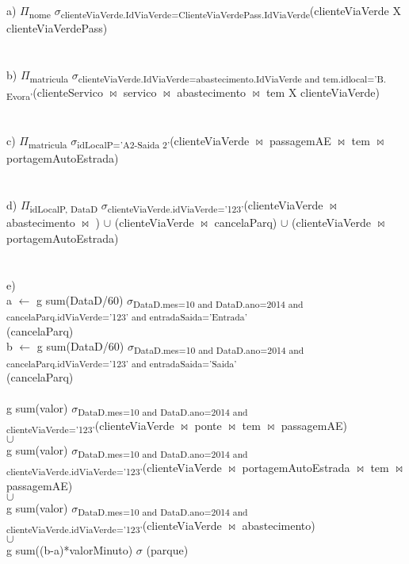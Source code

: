 \documentclass[a4paper]{article}
\begin{document}
\noindent a)
\indent $\Pi$\textsubscript{nome} $\sigma$\textsubscript{clienteViaVerde.IdViaVerde=ClienteViaVerdePass.IdViaVerde}(clienteViaVerde X clienteViaVerdePass)\\
\\
\\
\noindent b)
\indent $\Pi$\textsubscript{matricula} $\sigma$\textsubscript{clienteViaVerde.IdViaVerde=abastecimento.IdViaVerde and tem.idlocal='B. Evora'}(clienteServico $\bowtie$ servico $\bowtie$ abastecimento $\bowtie$ tem X clienteViaVerde)\\
\\
\\
\noindent c)
\indent $\Pi$\textsubscript{matricula} $\sigma$\textsubscript{idLocalP='A2-Saida 2'}(clienteViaVerde $\bowtie$ passagemAE $\bowtie$ tem $\bowtie$ portagemAutoEstrada)\\
\\
\\
\noindent d)
\indent $\Pi$\textsubscript{idLocalP, DataD} $\sigma$\textsubscript{clienteViaVerde.idViaVerde='123'}(clienteViaVerde $\bowtie$ abastecimento $\bowtie$ ) $\cup$ (clienteViaVerde $\bowtie$ cancelaParq) $\cup$ (clienteViaVerde $\bowtie$ portagemAutoEstrada)\\
\\
\\
\noindent e)\\
a $\leftarrow$ g sum(DataD/60) $\sigma$\textsubscript{DataD.mes=10 and DataD.ano=2014 and cancelaParq.idViaVerde='123' and entradaSaida='Entrada'}\\(cancelaParq)\\
b $\leftarrow$ g sum(DataD/60) $\sigma$\textsubscript{DataD.mes=10 and DataD.ano=2014 and cancelaParq.idViaVerde='123' and entradaSaida='Saida'}\\(cancelaParq)\\
\\
g sum(valor) $\sigma$\textsubscript{DataD.mes=10 and DataD.ano=2014 and clienteViaVerde='123'}(clienteViaVerde $\bowtie$ ponte $\bowtie$ tem $\bowtie$ passagemAE)\\ $\cup$\\ g sum(valor) $\sigma$\textsubscript{DataD.mes=10 and DataD.ano=2014 and clienteViaVerde.idViaVerde='123'}(clienteViaVerde $\bowtie$ portagemAutoEstrada $\bowtie$ tem $\bowtie$ passagemAE)\\ $\cup$\\ g sum(valor) $\sigma$\textsubscript{DataD.mes=10 and DataD.ano=2014 and clienteViaVerde.idViaVerde='123'}(clienteViaVerde $\bowtie$ abastecimento)\\ $\cup$\\ g sum((b-a)*valorMinuto) $\sigma$ (parque)\\
\end{document}
